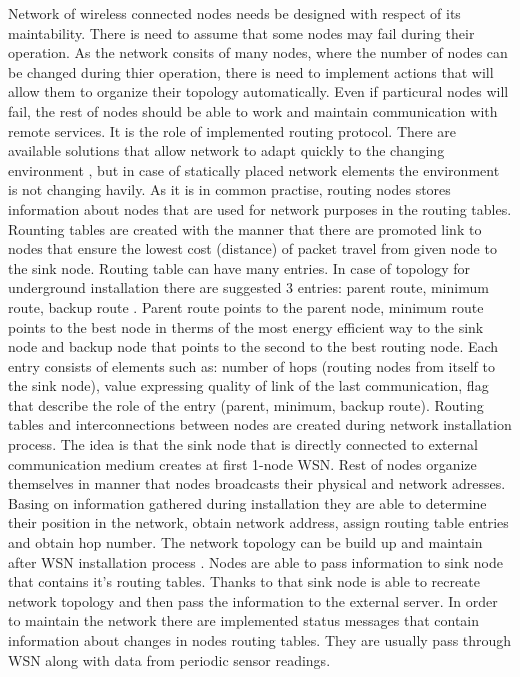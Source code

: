 \documentclass[../main.tex]{subfiles}
\begin{document}
Network of wireless connected nodes needs be designed with respect of its maintability. There is need to assume that some nodes may fail during their operation. As the network consits of many nodes, where the number of nodes can be changed during thier operation, there is need to implement actions that will allow them to organize their topology automatically. Even if particural nodes will fail, the rest of nodes should be able to work and maintain communication with remote services. It is the role of implemented routing protocol. There are available solutions that allow network to adapt quickly to the changing environment \cite{WSN_collective}, but in case of statically placed network elements the environment is not changing havily. As it is in common practise, routing nodes stores information about nodes that are used for network purposes in the routing tables. Rounting tables are created with the manner that there are promoted link to nodes that ensure the lowest cost (distance) of packet travel from given node to the sink node. Routing table can have many entries. In case of topology for underground installation there are suggested 3 entries: parent route, minimum route, backup route \cite{WSN_monitoring}. Parent route points to the parent node, minimum route points to the best node in therms of the most energy efficient way to the sink node and backup node that points to the second to the best routing node. Each entry consists of elements such as: number of hops (routing nodes from itself to the sink node), value expressing quality of link of the last communication, flag that describe the role of the entry (parent, minimum, backup route). Routing tables and interconnections between nodes are created during network installation process. The idea is that the sink node that is directly connected to external communication medium creates at first 1-node WSN. Rest of nodes organize themselves in manner that nodes broadcasts their physical and network adresses. Basing on information gathered during installation they are able to determine their position in the network, obtain network address, assign routing table entries and obtain hop number. The network topology can be build up and maintain after WSN installation process \cite{ZigBee_applications}. Nodes are able to pass information to sink node that contains it's routing tables. Thanks to that sink node is able to recreate network topology and then pass the information to the external server. In order to maintain the network there are implemented status messages that contain information about changes in nodes routing tables. They are usually pass through WSN along with data from periodic sensor readings.
\end{document}
